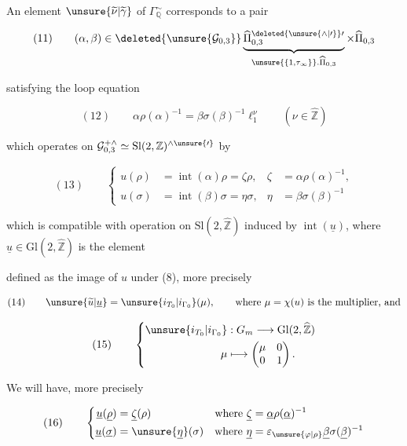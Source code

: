 An element $\unsure{\widetilde{\nu}|\widetilde{\gamma}}$ of
$\Gamma_{\mathbb Q}^{\sim}$ corresponds to a pair

\[
(11)\qquad
(\alpha,\beta)\in
\deleted{\unsure{\mathcal{G}_{0,3}}}
\underbrace{\widehat{\Pi}_{0,3}^{\deleted{\unsure{\wedge|\prime}}\prime}}_{
 \unsure{\{1,\tau_\infty\}}.\widehat{\Pi}_{0,3}}
\times\widehat{\Pi}_{0,3}
\]

satisfying  the loop equation

\[
(12)\qquad
\alpha\rho(\alpha)^{-1}=\beta\sigma(\beta)^{-1}\ell_1^\nu
\qquad (\nu\in\widehat{\mathbb Z})
\]

which operates on $\mathcal{G}_{0,3}^{+\wedge}\simeq
\mathrm{Sl}(2,\mathbb Z)^{\wedge\unsure{\prime}}$ by

\[
(13)\qquad
\left\{\begin{aligned}
u(\rho)&=\operatorname{int}(\alpha)\rho=\zeta\rho,
&\zeta&=\alpha\rho(\alpha)^{-1},\\
u(\sigma)&=\operatorname{int}(\beta)\sigma=\eta\sigma,
&\eta&=\beta\sigma(\beta)^{-1}
\end{aligned}\right.
\]

which is compatible with  operation
on $\mathrm{Sl}(2,\widehat{\mathbb Z})$ induced
by $\operatorname{int}(\underline{u})$, where
$\underline{u}\in\mathrm{Gl}(2,\widehat{\mathbb Z})$ is the element



defined  as the image of $u$ under (8), more
precisely

\[
(14)\qquad
\unsure{\widetilde{u}|\underline{u}}=
\unsure{i_{T_0}|i_{\Gamma_0}}(\mu),\qquad
\text{where }\mu=\chi(u)\text{ is the multiplier, and}
\]

\[
(15)\qquad
\left\{\begin{aligned}
\unsure{i_{T_0}|i_{\Gamma_0}} &:G_m\longrightarrow
\mathrm{Gl}(2,\widehat{\mathbb Z})\\
\mu&\longmapsto\begin{pmatrix}\mu&0\\0&1\end{pmatrix}.
\end{aligned}\right.
\]

We will have, more precisely

\[
(16)\qquad
\left\{\begin{aligned}
\underline{u}(\underline{\rho})&=\underline{\zeta}(\rho)
&\text{where }\underline{\zeta}&=\underline{\alpha}\rho(\underline{\alpha})^{-1}\\
\underline{u}(\underline{\sigma})&=\unsure{\underline{\eta}}(\sigma)
&\text{where }\underline{\eta}&=\varepsilon_{\unsure{\varphi|\rho}}
\underline{\beta}\sigma(\underline{\beta})^{-1}
\end{aligned}\right.
\]

